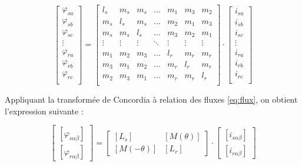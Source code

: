 \begin{equation}
    \left[ \begin{array}{c}
    \varphi_{sa} \\
    \varphi_{sb} \\
    \varphi_{sc} \\
    \vdots \\
    \varphi_{ra} \\
    \varphi_{rb} \\
    \varphi_{rc} \\
    \end{array} \right]
    =
    \left[ \begin{array}{ccccccc}
    l_s & m_s & m_s & \dots & m_1 & m_3 & m_2 \\
    m_s & l_s & m_s & \dots & m_2 & m_1 & m_3 \\
    m_s & m_s & l_s & \dots & m_3 & m_2 & m_1 \\
    \vdots & \vdots & \vdots & \ddots & \vdots & \vdots & \vdots \\
    m_1 & m_2 & m_3 & \dots & l_r & m_r & m_r \\
    m_3 & m_1 & m_2 & \dots & m_r & l_r & m_r \\
    m_2 & m_3 & m_1 & \dots & m_r & m_r & l_r \\
    \end{array} \right] \cdot 
    \left[ \begin{array}{c}
    i_{sa} \\
    i_{sb} \\
    i_{sc} \\
    \vdots \\
    i_{ra} \\
    i_{rb} \\
    i_{rc} \\
    \end{array} \right]
    \label{eq:flux}
\end{equation}

Appliquant la transformée de Concordia à relation des fluxes \ref{eq:flux}, on obtient l'expression suivante :

\begin{equation}
    \begin{bmatrix}
        [\varphi_{s\alpha \beta}] \\
        [\varphi_{r\alpha \beta}]
    \end{bmatrix} = 
    \begin{bmatrix}
        [L_s] & [M(\theta)] \\
        [M(-\theta)] & [L_r]
    \end{bmatrix} \cdot 
    \begin{bmatrix}
        [i_{s \alpha \beta}] \\
        [i_{r \alpha \beta}]
    \end{bmatrix}
    \label{eq:flux_alphabeta}
\end{equation}

